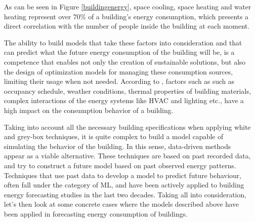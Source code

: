 As can be seen in Figure \ref{buildingenergy}, space cooling, space heating and water heating represent  over 70\% of a building's energy consumption, which presents a direct correlation with  the number of people inside the building at each moment.

The ability to build models that take these factors into consideration and that can predict what the future energy consumption of the building will be, is a competence that enables not only the creation of sustainable solutions, but also the design of optimization models for managing these consumption sources, limiting their usage when not needed. According to \cite{reviewtsf}, factors such as such as occupancy schedule, weather conditions, thermal properties of building materials, complex interactions of the energy systems like \ac{HVAC} and lighting etc., have a high impact on the consumption behavior of a building. 

Taking into account all the necessary building specifications when applying white and grey-box techniques, it is quite complex to build a model capable of simulating the behavior of the building. In this sense, data-driven methods appear as a viable alternative. These techniques are based on past recorded data, and try to construct a future model based on past observed energy patterns. Techniques that use past data to develop a model to predict future behaviour, often fall under the category of \ac{ML}, and have been actively applied to building energy forecasting studies in the last two decades. Taking all into consideration, let's then look at some concrete cases where the models described above have been applied in forecasting energy consumption of buildings.


